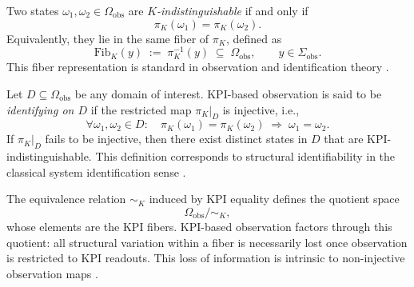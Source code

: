 \begin{definition}
Two states \(\omega_1,\omega_2\in\Omega_{\mathrm{obs}}\) are
\emph{\(K\)-indistinguishable} if and only if
\[
\pi_{K}(\omega_1)=\pi_{K}(\omega_2).
\]
Equivalently, they lie in the same fiber of \(\pi_K\), defined as
\[
\mathrm{Fib}_K(y)
\;:=\;
\pi_K^{-1}(y)
\;\subseteq\;
\Omega_{\mathrm{obs}},
\qquad
y\in\Sigma_{\mathrm{obs}}.
\]
This fiber representation is standard in observation and identification theory
\cite{kalman1960,ljung1999}.
\end{definition}

\begin{definition}
Let \(D\subseteq\Omega_{\mathrm{obs}}\) be any domain of interest.
KPI-based observation is said to be \emph{identifying on \(D\)} if the restricted
map \(\pi_K|_{D}\) is injective, i.e.,
\[
\forall \omega_1,\omega_2\in D:\quad
\pi_K(\omega_1)=\pi_K(\omega_2)
\;\Longrightarrow\;
\omega_1=\omega_2.
\]
If \(\pi_K|_{D}\) fails to be injective, then there exist distinct states in \(D\)
that are KPI-indistinguishable.
This definition corresponds to structural identifiability in the classical
system identification sense \cite{ljung1999,walter1997}.
\end{definition}

\begin{definition}
The equivalence relation \(\sim_K\) induced by KPI equality defines the quotient
space
\[
\Omega_{\mathrm{obs}} \big/ \!\sim_K ,
\]
whose elements are the KPI fibers.
KPI-based observation factors through this quotient: all structural variation
within a fiber is necessarily lost once observation is restricted to KPI
readouts.
This loss of information is intrinsic to non-injective observation maps
\cite{ash1990}.
\end{definition}
